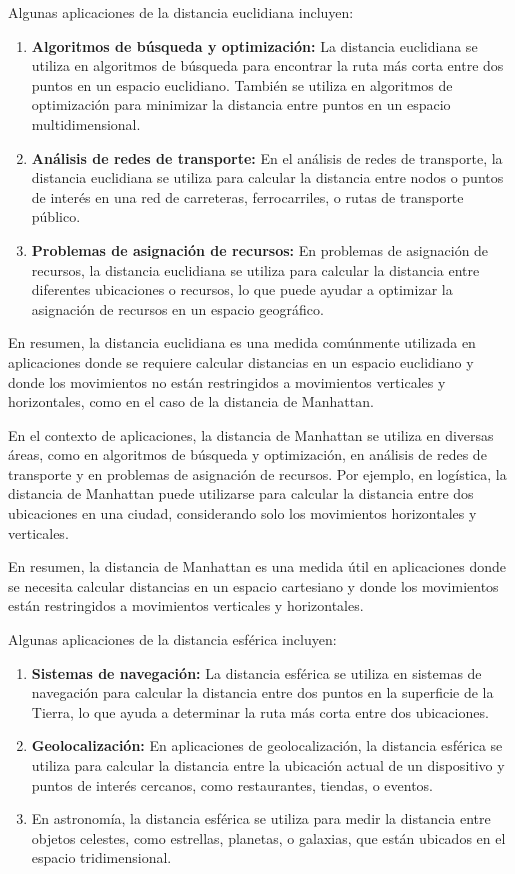 Algunas aplicaciones de la distancia euclidiana incluyen:

\begin{enumerate}
\item \textbf{ Algoritmos de búsqueda y optimización:} La distancia euclidiana se utiliza en algoritmos de búsqueda para encontrar la ruta más corta entre dos puntos en un espacio euclidiano. También se utiliza en algoritmos de optimización para minimizar la distancia entre puntos en un espacio multidimensional.
\item \textbf{ Análisis de redes de transporte:} En el análisis de redes de transporte, la distancia euclidiana se utiliza para calcular la distancia entre nodos o puntos de interés en una red de carreteras, ferrocarriles, o rutas de transporte público.
\item \textbf{Problemas de asignación de recursos:} En problemas de asignación de recursos, la distancia euclidiana se utiliza para calcular la distancia entre diferentes ubicaciones o recursos, lo que puede ayudar a optimizar la asignación de recursos en un espacio geográfico.
\end{enumerate}

En resumen, la distancia euclidiana es una medida comúnmente utilizada en aplicaciones donde se requiere calcular distancias en un espacio euclidiano y donde los movimientos no están restringidos a movimientos verticales y horizontales, como en el caso de la distancia de Manhattan.

En el contexto de aplicaciones, la distancia de Manhattan se utiliza en diversas áreas, como en algoritmos de búsqueda y optimización, en análisis de redes de transporte y en problemas de asignación de recursos. Por ejemplo, en logística, la distancia de Manhattan puede utilizarse para calcular la distancia entre dos ubicaciones en una ciudad, considerando solo los movimientos horizontales y verticales.

En resumen, la distancia de Manhattan es una medida útil en aplicaciones donde se necesita calcular distancias en un espacio cartesiano y donde los movimientos están restringidos a movimientos verticales y horizontales.

Algunas aplicaciones de la distancia esférica incluyen:

\begin{enumerate}
	\item \textbf{Sistemas de navegación:} La distancia esférica se utiliza en sistemas de navegación para calcular la distancia entre dos puntos en la superficie de la Tierra, lo que ayuda a determinar la ruta más corta entre dos ubicaciones.
	\item \textbf{Geolocalización:} En aplicaciones de geolocalización, la distancia esférica se utiliza para calcular la distancia entre la ubicación actual de un dispositivo y puntos de interés cercanos, como restaurantes, tiendas, o eventos.
	\item {} En astronomía, la distancia esférica se utiliza para medir la distancia entre objetos celestes, como estrellas, planetas, o galaxias, que están ubicados en el espacio tridimensional.
\end{enumerate}

